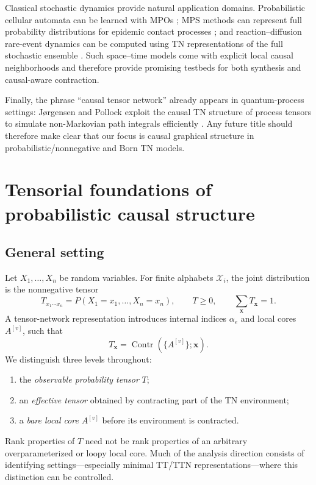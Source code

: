 \documentclass[11pt]{article}
\theoremstyle{remark}
\begin{document}
Classical stochastic dynamics provide natural application domains. Probabilistic cellular automata can be learned with MPOs \cite{casagrande2024pca}; MPS methods can represent full probability distributions for epidemic contact processes \cite{merbis2023epidemic}; and reaction--diffusion rare-event dynamics can be computed using TN representations of the full stochastic ensemble \cite{nicholson2023rare}. Such space--time models come with explicit local causal neighborhoods and therefore provide promising testbeds for both synthesis and causal-aware contraction.

Finally, the phrase ``causal tensor network'' already appears in quantum-process settings: J\o rgensen and Pollock exploit the causal TN structure of process tensors to simulate non-Markovian path integrals efficiently \cite{jorgensen2019causal}. Any future title should therefore make clear that our focus is causal graphical structure in probabilistic/nonnegative and Born TN models.

\section{Tensorial foundations of probabilistic causal structure}
\label{sec:foundations}

\subsection{General setting}

Let $X_1,\ldots,X_n$ be random variables. For finite alphabets $\mathcal X_i$, the joint distribution is the nonnegative tensor
\begin{equation}
T_{x_1\cdots x_n}=P(X_1=x_1,\ldots,X_n=x_n),\qquad T\ge 0,\qquad \sum_{\bm x}T_{\bm x}=1.
\end{equation}
A tensor-network representation introduces internal indices $\alpha_e$ and local cores $A^{[v]}$, such that
\begin{equation}
T_{\bm x}=\operatorname{Contr}\left(\{A^{[v]}\};\bm x\right).
\end{equation}
We distinguish three levels throughout:
\begin{enumerate}
\item the \emph{observable probability tensor} $T$;
\item an \emph{effective tensor} obtained by contracting part of the TN environment;
\item a \emph{bare local core} $A^{[v]}$ before its environment is contracted.
\end{enumerate}
Rank properties of $T$ need not be rank properties of an arbitrary overparameterized or loopy local core. Much of the analysis direction consists of identifying settings---especially minimal TT/TTN representations---where this distinction can be controlled.
\end{document}
